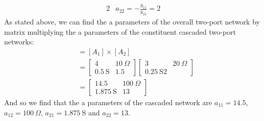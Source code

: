 \begin{enumerate}
{\begin{alignat*}{2}
			&a_{22} = -\frac{y_{11}}{y_{21}} = 2
		\end{alignat*}
		As stated above, we can find the a parameters of the overall two-port network by matrix multiplying the a parameters of the constituent cascaded two-port networks:
		\begin{align*}
			[A_T] &= [A_1] \times [A_2] \\
			&= 
				\begin{bmatrix}
					4 & 10 \ \Omega \\
					0.5 \ \text{S} & 1.5
				\end{bmatrix}
				\begin{bmatrix}
					3 & 20 \ \Omega \\
					0.25 \ \text{S} 2
				\end{bmatrix}
			\\
			&=
				\begin{bmatrix}
					14.5 & 100 \ \Omega \\
					1.875 \ \text{S} & 13
				\end{bmatrix}
		\end{align*}
		And so we find that the a parameters of the cascaded network are $a_{11} = 14.5$, $a_{12} = 100 \ \Omega$, $a_{21} = 1.875 \ \text{S}$ and $a_{22} = 13$.
		\\
	}
\end{enumerate}